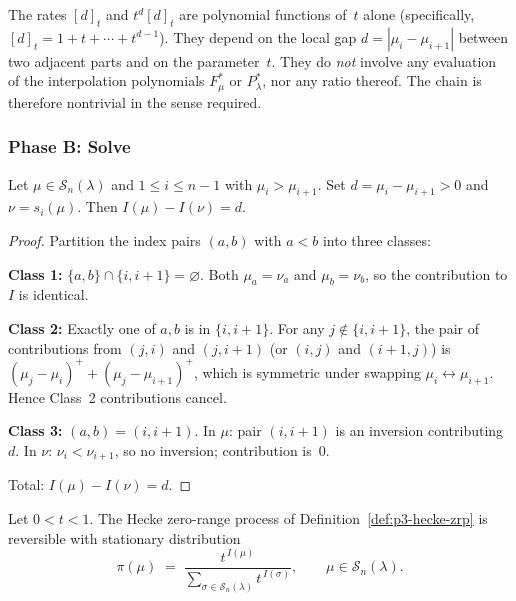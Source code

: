 \begin{remark}[Nontriviality]
\label{rem:p3-nontrivial}
The rates $[d]_t$ and $t^d [d]_t$ are polynomial functions of~$t$ alone
(specifically, $[d]_t = 1 + t + \cdots + t^{d-1}$). They depend on the
local gap $d = |\mu_i - \mu_{i+1}|$ between two adjacent parts and on
the parameter~$t$. They do \emph{not} involve any evaluation of the
interpolation polynomials $F^*_\mu$ or $P^*_\lambda$, nor any ratio
thereof. The chain is therefore nontrivial in the sense required.
\end{remark}

\bigskip
\subsubsection*{Phase B: Solve}

\begin{lemma}
\label{lem:p3-Ichange}
Let $\mu \in \mathcal{S}_n(\lambda)$ and $1 \leq i \leq n-1$ with
$\mu_i > \mu_{i+1}$.
Set $d = \mu_i - \mu_{i+1} > 0$ and $\nu = s_i(\mu)$.
Then $I(\mu) - I(\nu) = d$.
\end{lemma}

\begin{proof}
Partition the index pairs $(a,b)$ with $a < b$ into three classes:

\textbf{Class 1:} $\{a,b\} \cap \{i,i{+}1\} = \varnothing$.
Both $\mu_a = \nu_a$ and $\mu_b = \nu_b$, so the contribution to $I$
is identical.

\textbf{Class 2:} Exactly one of $a,b$ is in $\{i,i{+}1\}$.
For any $j \notin \{i,i{+}1\}$, the pair of contributions from
$(j,i)$ and $(j,i{+}1)$ (or $(i,j)$ and $(i{+}1,j)$) is
$(\mu_j - \mu_i)^+ + (\mu_j - \mu_{i+1})^+$, which is symmetric
under swapping $\mu_i \leftrightarrow \mu_{i+1}$. Hence Class~2
contributions cancel.

\textbf{Class 3:} $(a,b) = (i,i{+}1)$.
In $\mu$: pair $(i,i{+}1)$ is an inversion contributing $d$.
In $\nu$: $\nu_i < \nu_{i+1}$, so no inversion; contribution is~$0$.

Total: $I(\mu) - I(\nu) = d$.
\end{proof}

\begin{theorem}
\label{thm:p3-stationary}
Let $0 < t < 1$. The Hecke zero-range process of
Definition~\ref{def:p3-hecke-zrp} is reversible with stationary
distribution
\begin{equation}
\label{eq:p3-stationary}
\pi(\mu) \;=\;
\frac{t^{\,I(\mu)}}{\displaystyle\sum_{\sigma \in \mathcal{S}_n(\lambda)}
t^{\,I(\sigma)}},
\qquad \mu \in \mathcal{S}_n(\lambda).
\end{equation}
\end{theorem}

